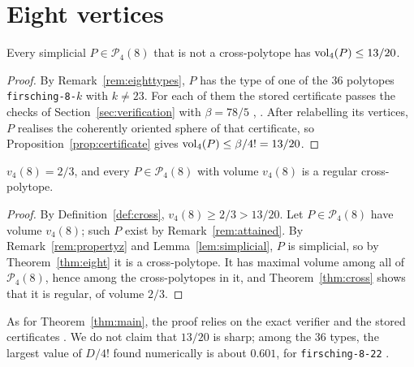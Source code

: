 \section{Eight vertices}
\label{sec:eight}

\begin{theorem}
  \label{thm:eight}
  Every simplicial $P \in \mathcal{P}_{4}(8)$ that is not a cross-polytope has
  $\operatorname{vol}_{4}(P) \leq 13/20$.
\end{theorem}

\begin{proof}
  By Remark~\ref{rem:eighttypes}, $P$ has the type of one of the $36$
  polytopes \texttt{firsching-8-$k$} with $k \neq 23$. For each of them the
  stored certificate passes the checks of Section~\ref{sec:verification} with
  $\beta = 78/5$ , . After
  relabelling its vertices, $P$ realises the coherently oriented sphere of
  that certificate, so Proposition~\ref{prop:certificate} gives
  $\operatorname{vol}_{4}(P) \leq \beta/4! = 13/20$.
\end{proof}

\begin{corollary}
  \label{cor:eight}
  $v_{4}(8) = 2/3$, and every $P \in \mathcal{P}_{4}(8)$ with volume
  $v_{4}(8)$ is a regular cross-polytope.
\end{corollary}

\begin{proof}
  By Definition~\ref{def:cross}, $v_{4}(8) \geq 2/3 > 13/20$. Let
  $P \in \mathcal{P}_{4}(8)$ have volume $v_{4}(8)$; such $P$ exist by
  Remark~\ref{rem:attained}. By Remark~\ref{rem:propertyz} and
  Lemma~\ref{lem:simplicial}, $P$ is simplicial, so by
  Theorem~\ref{thm:eight} it is a cross-polytope. It has maximal volume among
  all of $\mathcal{P}_{4}(8)$, hence among the cross-polytopes in it, and
  Theorem~\ref{thm:cross} shows that it is regular, of volume $2/3$.
\end{proof}

\begin{remark}
  As for Theorem~\ref{thm:main}, the proof relies on the exact verifier
   and the stored certificates . We do not claim that $13/20$ is sharp; among the
  $36$ types, the largest value of $D/4!$ found numerically is about $0.601$,
  for \texttt{firsching-8-22} .
\end{remark}
